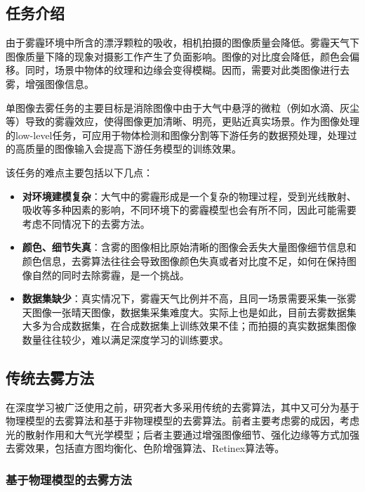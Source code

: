 \documentclass{article}
\begin{document}
\subsection{任务介绍}

由于雾霾环境中所含的漂浮颗粒的吸收，相机拍摄的图像质量会降低。雾霾天气下图像质量下降的现象对摄影工作产生了负面影响。图像的对比度会降低，颜色会偏移。同时，场景中物体的纹理和边缘会变得模糊。因而，需要对此类图像进行去雾，增强图像信息。

单图像去雾任务的主要目标是消除图像中由于大气中悬浮的微粒（例如水滴、灰尘等）导致的雾霾效应，使得图像更加清晰、明亮，更贴近真实场景。作为图像处理的low-level任务，可应用于物体检测和图像分割等下游任务的数据预处理，处理过的高质量的图像输入会提高下游任务模型的训练效果。

该任务的难点主要包括以下几点：

\begin{itemize}
    \item \textbf{对环境建模复杂}：大气中的雾霾形成是一个复杂的物理过程，受到光线散射、吸收等多种因素的影响，不同环境下的雾霾模型也会有所不同，因此可能需要考虑不同情况下的去雾方法。
    
    \item \textbf{颜色、细节失真}：含雾的图像相比原始清晰的图像会丢失大量图像细节信息和颜色信息，去雾算法往往会导致图像颜色失真或者对比度不足，如何在保持图像自然的同时去除雾霾，是一个挑战。
    
    \item \textbf{数据集缺少}：真实情况下，雾霾天气比例并不高，且同一场景需要采集一张雾天图像一张晴天图像，数据集采集难度大。实际上也是如此，目前去雾数据集大多为合成数据集，在合成数据集上训练效果不佳；而拍摄的真实数据集图像数量往往较少，难以满足深度学习的训练要求。
  \end{itemize}
  
\subsection{传统去雾方法}

在深度学习被广泛使用之前，研究者大多采用传统的去雾算法，其中又可分为基于物理模型的去雾算法和基于非物理模型的去雾算法。前者主要考虑雾的成因，考虑光的散射作用和大气光学模型；后者主要通过增强图像细节、强化边缘等方式加强去雾效果，包括直方图均衡化、色阶增强算法、Retinex算法等。

\subsubsection{基于物理模型的去雾方法}
\end{document}

